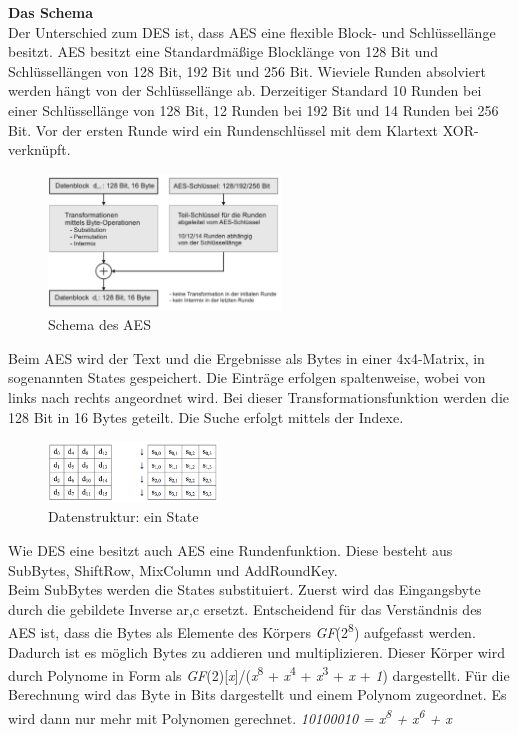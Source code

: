 \documentclass[11pt]{scrartcl}
\begin{document}
\noindent \textbf{Das Schema}\\
Der Unterschied zum DES ist, dass AES eine flexible Block- und Schlüssellänge besitzt. AES besitzt eine Standardmäßige Blocklänge von 128 Bit und Schlüssellängen von 128 Bit, 192 Bit und 256 Bit. Wieviele Runden absolviert werden hängt von der Schlüssellänge ab. Derzeitiger Standard 10 Runden bei einer Schlüssellänge von 128 Bit, 12 Runden bei 192 Bit und 14 Runden bei 256 Bit. \grqq{}Vor der ersten Runde wird ein Rundenschlüssel mit dem Klartext XOR-verknüpft.\grqq{}\cite{2} \cite{3}
\begin{figure}[H]
\includegraphics[width=0.55\textwidth]{Bilder/AES/AES_Schema}
	\caption{Schema des AES \cite{3}}
	\label{fig6}
\end{figure}
\noindent 
Beim AES wird der Text und die Ergebnisse als Bytes in einer 4x4-Matrix, in sogenannten States gespeichert. Die Einträge erfolgen spaltenweise, wobei von links nach rechts angeordnet wird. Bei dieser Transformationsfunktion werden die 128 Bit in 16 Bytes geteilt. Die Suche erfolgt mittels der Indexe. \cite{2}\cite{3}
\begin{figure}[H]
\includegraphics[width=0.40\textwidth]{Bilder/AES/AES_State}
	\caption{Datenstruktur: ein State \cite{3}}
	\label{fig7}
\end{figure}
\noindent
Wie DES eine besitzt auch AES eine Rundenfunktion. Diese besteht aus SubBytes, ShiftRow, MixColumn und AddRoundKey.\\
Beim SubBytes werden die States substituiert. Zuerst wird das Eingangsbyte durch die gebildete Inverse a{\tiny r,c} ersetzt.
\grqq{}Entscheidend für das Verständnis des AES ist, dass die Bytes als Elemente des Körpers \textit{GF}(2\textsuperscript{8}) aufgefasst werden.\grqq{}\cite{2} Dadurch ist es möglich Bytes zu addieren und multiplizieren. Dieser Körper wird durch Polynome in Form als \textit{GF}(2)[\textit{x}]/(\textit{x}\textsuperscript{8} + \textit{x}\textsuperscript{4} + \textit{x}\textsuperscript{3} + \textit{x} + \textit{1}) dargestellt. Für die Berechnung wird das Byte in Bits dargestellt und einem Polynom zugeordnet. Es wird dann nur mehr mit Polynomen gerechnet. \textit{{10100010} = x\textsuperscript{8} + x\textsuperscript{6} + x}\\
\end{document}
